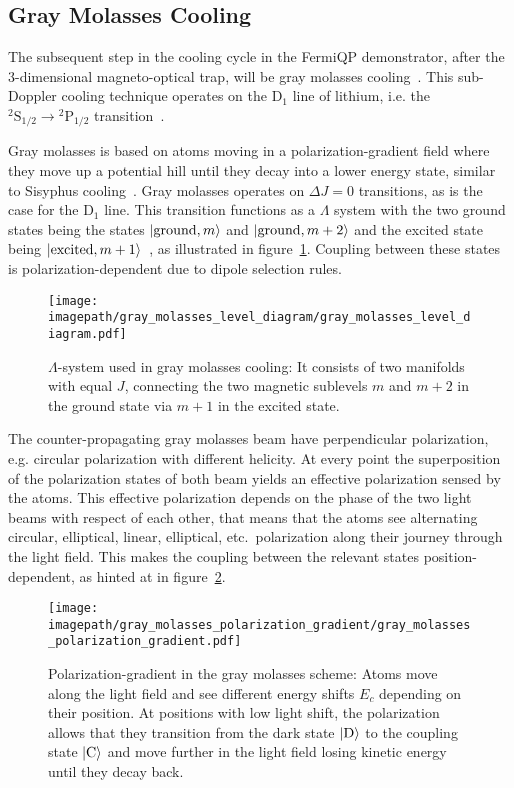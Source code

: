 \subsection*{Gray Molasses Cooling}
The subsequent step in the cooling cycle in the FermiQP demonstrator, after the 3-dimensional magneto-optical trap, will be gray molasses cooling~\cite{grynberg_proposal_1994,weidemuller_novel_1994}. This sub-Doppler cooling technique operates on the D$_1$ line of lithium, i.e. the $^2\text{S}_{1/2} \rightarrow {^2\text{P}_{1/2}}$ transition~\cite{burchianti_efficient_2014}.

Gray molasses is based on atoms moving in a polarization-gradient field where they move up a potential hill until they decay into a lower energy state, similar to Sisyphus cooling~\cite{foot_atomic_2005}. Gray molasses operates on $\Delta J = 0$ transitions, as is the case for the D$_1$ line. This transition functions as a $\Lambda$ system with the two ground states being the states $\Ket{\text{ground}, m}$ and $\Ket{\text{ground}, m + 2}$ and the excited state being $\Ket{\text{excited}, m + 1}$~\cite{weidemuller_novel_1994}, as illustrated in figure~\ref{fig:gray_molasses_level_diagram}. Coupling between these states is polarization-dependent due to dipole selection rules.
\begin{figure}
    \centering
    \texttt{[image: \\imagepath/gray\_molasses\_level\_diagram/gray\_molasses\_level\_diagram.pdf]}
    \caption{$\Lambda$-system used in gray molasses cooling: It consists of two manifolds with equal $J$, connecting the two magnetic sublevels $m$ and $m+2$ in the ground state via $m+1$ in the excited state.}
    \label{fig:gray_molasses_level_diagram}
\end{figure}

The counter-propagating gray molasses beam have perpendicular polarization, e.g. circular polarization with different helicity. At every point the superposition of the polarization states of both beam yields an effective polarization sensed by the atoms. This effective polarization depends on the phase of the two light beams with respect of each other, that means that the atoms see alternating circular, elliptical, linear, elliptical, etc.~polarization along their journey through the light field. This makes the coupling between the relevant states position-dependent, as hinted at in figure~\ref{fig:gray_molasses_polarization_gradient}.

\begin{figure}
    \centering
    \texttt{[image: \\imagepath/gray\_molasses\_polarization\_gradient/gray\_molasses\_polarization\_gradient.pdf]}
    \caption{Polarization-gradient in the gray molasses scheme: Atoms move along the light field and see different energy shifts $E_c$ depending on their position. At positions with low light shift, the polarization allows that they transition from the dark state $\Ket{\text{D}}$ to the coupling state $\Ket{\text{C}}$ and move further in the light field losing kinetic energy until they decay back.}
    \label{fig:gray_molasses_polarization_gradient}
\end{figure}

